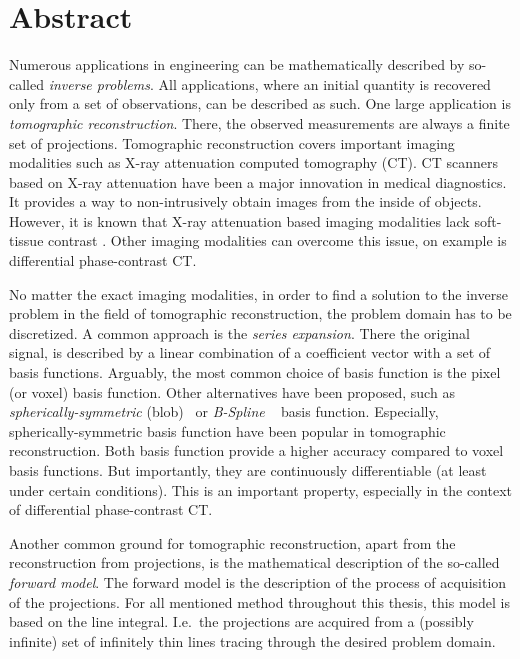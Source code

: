 \chapter*{Abstract}

\noindent%
Numerous applications in engineering can be mathematically described by so-called \textit{inverse
	problems}. All applications, where an initial quantity is recovered only from a set of observations,
can be described as such. One large application is \textit{tomographic reconstruction}. There, the
observed measurements are always a finite set of projections. Tomographic reconstruction covers
important imaging modalities such as X-ray attenuation computed tomography (CT). CT scanners based
on X-ray attenuation have been a major innovation in medical diagnostics. It provides a way to
non-intrusively obtain images from the inside of objects. However, it is known that X-ray
attenuation based imaging modalities lack soft-tissue contrast \cite{pfeiffer_phase_2006}. Other
imaging modalities can overcome this issue, on example is differential phase-contrast CT.

No matter the exact imaging modalities, in order to find a solution to the inverse problem in the
field of tomographic reconstruction, the problem domain has to be discretized. A common approach is
the \textit{series expansion}. There the original signal, is described by a linear combination of a
coefficient vector with a set of basis functions. Arguably, the most common choice of basis function
is the pixel (or voxel) basis function. Other alternatives have been proposed, such as
\textit{spherically-symmetric} (blob)~\cite{lewitt_multidimensional_1990} or \textit{B-Spline}
~\cite{unser_fast_1991} basis function. Especially, spherically-symmetric basis function have been
popular in tomographic reconstruction. Both basis function provide a higher accuracy compared to
voxel basis functions. But importantly, they are continuously differentiable (at least under certain
conditions). This is an important property, especially in the context of differential phase-contrast
CT\@.

Another common ground for tomographic reconstruction, apart from the reconstruction from
projections, is the mathematical description of the so-called \textit{forward model}. The forward
model is the description of the process of acquisition of the projections. For all mentioned method
throughout this thesis, this model is based on the line integral. I.e.\ the projections are acquired
from a (possibly infinite) set of infinitely thin lines tracing through the desired problem domain.

